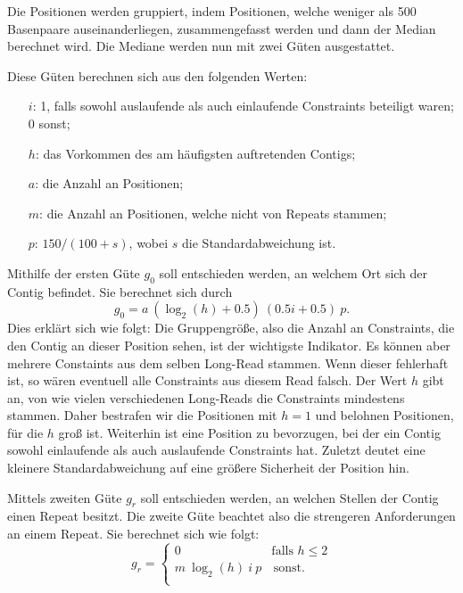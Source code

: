 Die Positionen werden gruppiert, indem Positionen, welche weniger als 500 Basenpaare auseinanderliegen, zusammengefasst werden und dann der Median berechnet wird. Die Mediane werden nun mit zwei Güten ausgestattet. 

Diese Güten berechnen sich aus den folgenden Werten:
\begin{itemize}
\item[$i$:] 1, falls sowohl auslaufende als auch einlaufende Constraints beteiligt waren; \\ 0 sonst;
\item[$h$:] das Vorkommen des am häufigsten auftretenden Contigs;
\item[$a$:] die Anzahl an Positionen;
\item[$m$:] die Anzahl an Positionen, welche nicht von Repeats stammen;
\item[$p$:] $150 / (100+s)$, wobei $s$ die Standardabweichung ist.
\end{itemize}

Mithilfe der ersten Güte $g_0$ soll entschieden werden, an welchem Ort sich der Contig befindet. Sie berechnet sich durch 
\[  g_0 = a\ (\log_2(h) + 0.5) \ (0.5i + 0.5)\  p . \]
Dies erklärt sich wie folgt: Die Gruppengröße, also die Anzahl an Constraints, die den Contig an dieser Position sehen, ist der wichtigste Indikator. 
Es können aber mehrere Constaints aus dem selben Long-Read stammen. Wenn dieser fehlerhaft ist, so wären eventuell alle Constraints aus diesem Read falsch. Der Wert $h$ gibt an, von wie vielen verschiedenen Long-Reads die Constraints mindestens stammen. Daher bestrafen wir die Positionen mit $h=1$ und belohnen Positionen, für die $h$ groß ist. 
Weiterhin ist eine Position zu bevorzugen, bei der ein Contig sowohl einlaufende als auch auslaufende Constraints hat. Zuletzt deutet eine kleinere Standardabweichung auf eine größere Sicherheit der Position hin. 


Mittels zweiten Güte $g_r$ soll entschieden werden, an welchen Stellen der Contig einen Repeat besitzt. Die zweite Güte beachtet also die strengeren Anforderungen an einem Repeat. 
Sie berechnet sich wie folgt:
\[ g_r = \left\{
\begin{array}{ll}
0 & \textrm{falls } h \leq 2 \\
 m\ \log_2(h) \ i \  p & \, \textrm{sonst.} \\
\end{array}
\right. \]

